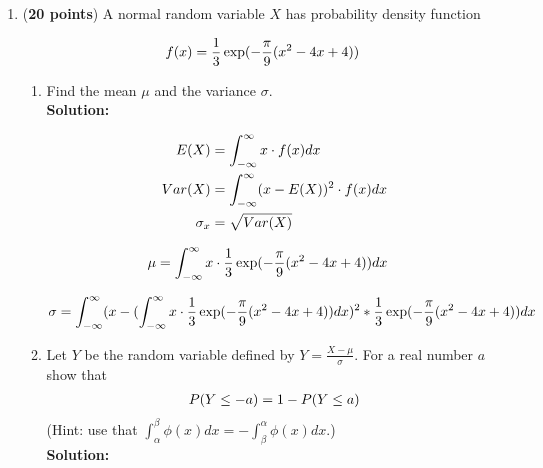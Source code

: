 \documentclass[a4paper]{article}
\begin{document}
\begin{enumerate}
\begin{enumerate}
	
\end{enumerate}



\item (\textbf{20 points}) A normal random variable $X$ has probability density function

\begin{align}
f(x) = \frac{1}{3}\exp(-\frac{\pi}{9}(x^2 - 4x + 4))\notag
\end{align}



\begin{enumerate}
	\item Find the mean $\mu$ and the variance $\sigma$.\\
	\textbf{Solution:}


\begin{align}
	E(X) &= \int_{-\infty}^{\infty} x \cdot f(x)dx\notag\\
	Var(X) &= \int_{-\infty}^{\infty} (x - E(X))^2 \cdot f(x)dx\notag\\
	\sigma_x &= \sqrt{Var(X)}\notag
\end{align}



\begin{align}
	\mu &= \int_{-\infty}^{\infty} x \cdot \frac{1}{3}\exp(-\frac{\pi}{9}(x^2 - 4x + 4))dx\notag
\end{align}



\begin{align}
	\sigma &= \int_{-\infty}^{\infty} (x - (\int_{-\infty}^{\infty} x \cdot \frac{1}{3}\exp(-\frac{\pi}{9}(x^2 - 4x + 4))dx)^2 * \frac{1}{3}\exp(-\frac{\pi}{9}(x^2 - 4x + 4))dx\notag
\end{align}




	
	\item Let $Y$ be the random variable defined by $Y = \frac{X - \mu}{\sigma}$. For a real number $a$ show that \begin{align}
	P(Y \leq -a) = 1 - P(Y \leq a)\notag
	\end{align}
	(Hint: use that $\int_\alpha^\beta \phi(x)dx = -\int_\beta^\alpha \phi(x)dx.$)\\
	\textbf{Solution:}




\end{enumerate}



	
	


\end{enumerate}
\end{document}
